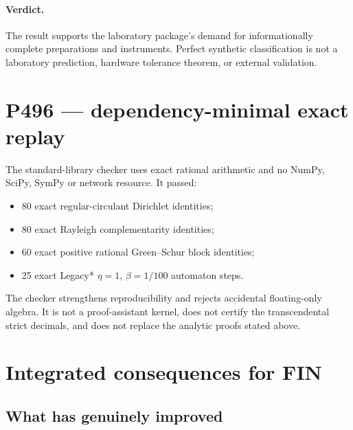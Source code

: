 \documentclass[11pt,a4paper]{article}
\theoremstyle{definition}
\theoremstyle{remark}
\begin{document}
\paragraph{Verdict.}
The result supports the laboratory package's demand for informationally complete preparations and instruments. Perfect synthetic classification is not a laboratory prediction, hardware tolerance theorem, or external validation.

\section{P496 --- dependency-minimal exact replay}

The standard-library checker uses exact rational arithmetic and no NumPy, SciPy, SymPy or network resource. It passed:

\begin{itemize}
\item 80 exact regular-circulant Dirichlet identities;
\item 80 exact Rayleigh complementarity identities;
\item 60 exact positive rational Green--Schur block identities;
\item 25 exact Legacy* $\eta=1$, $\beta=1/100$ automaton steps.
\end{itemize}

The checker strengthens reproducibility and rejects accidental floating-only algebra. It is not a proof-assistant kernel, does not certify the transcendental strict decimals, and does not replace the analytic proofs stated above.

\section{Integrated consequences for FIN}

\subsection{What has genuinely improved}
\end{document}
